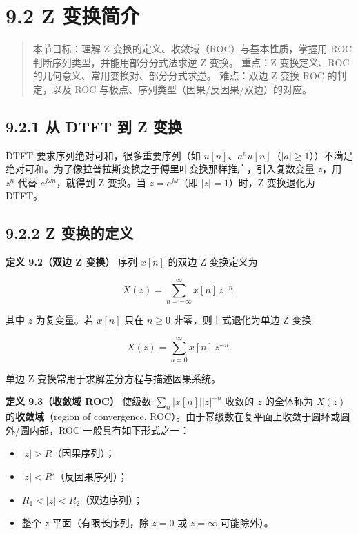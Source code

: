 \section{9.2 Z 变换简介}\label{z-ux53d8ux6362ux7b80ux4ecb}

\begin{quote}
本节目标：理解 Z 变换的定义、收敛域（ROC）与基本性质，掌握用 ROC
判断序列类型，并能用部分分式法求逆 Z 变换。 重点：Z 变换定义、ROC
的几何意义、常用变换对、部分分式求逆。 难点：双边 Z 变换 ROC
的判定，以及 ROC 与极点、序列类型（因果/反因果/双边）的对应。
\end{quote}

\subsection{9.2.1 从 DTFT 到 Z
变换}\label{ux4ece-dtft-ux5230-z-ux53d8ux6362}

DTFT 要求序列绝对可和，很多重要序列（如
\(u[n]\)、\(a^n u[n]\)（\(|a|\ge1\)））不满足绝对可和。为了像拉普拉斯变换之于傅里叶变换那样推广，引入复数变量
\(z\)，用 \(z^n\) 代替 \(e^{j\omega n}\)，就得到 Z 变换。当
\(z=e^{j\omega}\)（即 \(|z|=1\)）时，Z 变换退化为 DTFT。

\subsection{9.2.2 Z 变换的定义}\label{z-ux53d8ux6362ux7684ux5b9aux4e49}

\textbf{定义 9.2（双边 Z 变换）} 序列 \(x[n]\) 的双边 Z 变换定义为

\[
\boxed{\;X(z) = \sum_{n=-\infty}^{\infty} x[n]\,z^{-n}.\;}
\]

其中 \(z\) 为复变量。若 \(x[n]\) 只在 \(n\ge0\) 非零，则上式退化为单边 Z
变换

\[
X(z) = \sum_{n=0}^{\infty} x[n]\,z^{-n}.
\]

单边 Z 变换常用于求解差分方程与描述因果系统。

\textbf{定义 9.3（收敛域 ROC）} 使级数 \(\sum_{n} |x[n]| |z|^{-n}\)
收敛的 \(z\) 的全体称为 \(X(z)\) 的\textbf{收敛域}（region of
convergence, ROC）。由于幂级数在复平面上收敛于圆环或圆外/圆内部，ROC
一般具有如下形式之一：

\begin{itemize}
\tightlist
\item
  \(|z|>R\)（因果序列）；
\item
  \(|z|<R'\)（反因果序列）；
\item
  \(R_1<|z|<R_2\)（双边序列）；
\item
  整个 \(z\) 平面（有限长序列，除 \(z=0\) 或 \(z=\infty\) 可能除外）。
\end{itemize}

